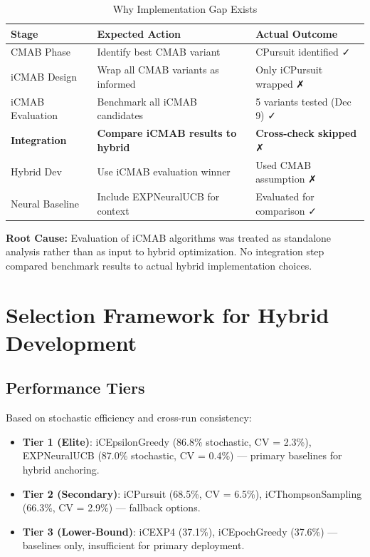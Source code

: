 \documentclass[12pt,a4paper]{article}
\newcommand{\warning}[1]{\textcolor{warningred}{\textbf{#1}}}
\begin{document}
\begin{table}[H]
\centering
\caption{Why Implementation Gap Exists}
\begin{tabular}{@{}lll@{}}
\toprule
\textbf{Stage} & \textbf{Expected Action} & \textbf{Actual Outcome} \\
\midrule
CMAB Phase & Identify best CMAB variant & CPursuit identified ✓ \\
iCMAB Design & Wrap all CMAB variants as informed & Only iCPursuit wrapped ✗ \\
iCMAB Evaluation & Benchmark all iCMAB candidates & 5 variants tested (Dec 9) ✓ \\
\warning{Integration} & \warning{Compare iCMAB results to hybrid} & \warning{Cross-check skipped} ✗ \\
Hybrid Dev & Use iCMAB evaluation winner & Used CMAB assumption ✗ \\
Neural Baseline & Include EXPNeuralUCB for context & Evaluated for comparison ✓ \\
\bottomrule
\end{tabular}
\end{table}

\textbf{Root Cause:} Evaluation of iCMAB algorithms was treated as standalone analysis rather than as input to hybrid optimization. No integration step compared benchmark results to actual hybrid implementation choices.

\section{Selection Framework for Hybrid Development}

\subsection{Performance Tiers}

Based on stochastic efficiency and cross-run consistency:

\begin{itemize}
\item \textbf{Tier 1 (Elite)}: iCEpsilonGreedy (86.8\% stochastic, CV = 2.3\%), EXPNeuralUCB (87.0\% stochastic, CV = 0.4\%) --- primary baselines for hybrid anchoring.
\item \textbf{Tier 2 (Secondary)}: iCPursuit (68.5\%, CV = 6.5\%), iCThompsonSampling (66.3\%, CV = 2.9\%) --- fallback options.
\item \textbf{Tier 3 (Lower-Bound)}: iCEXP4 (37.1\%), iCEpochGreedy (37.6\%) --- baselines only, insufficient for primary deployment.
\end{itemize}
\end{document}
